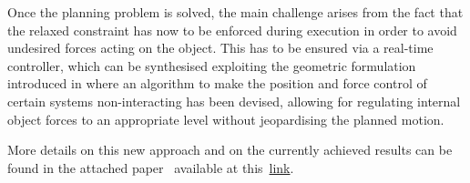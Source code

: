 Once the planning problem is solved, the main challenge arises from the fact that the relaxed constraint has now to be enforced during execution in order to avoid undesired forces acting on the object.
This has to be ensured via a real-time controller, which can be synthesised exploiting the geometric formulation introduced in \cite{prattichizzo1997consistent,prattichizzo1998dynamic} where an algorithm to make the position and force control of certain systems non-interacting has been devised, allowing for regulating internal object forces to an appropriate level without jeopardising the planned motion.

More details on this new approach and on the currently achieved results can be found in the attached paper~\cite{bonilla2015samplebased} available at this~\href{./attachedPapers/SampleBasedMotionPlanningSoftRobots.pdf}{link}. 
